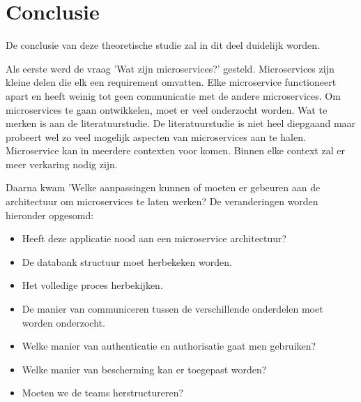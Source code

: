 
\chapter{Conclusie}
\label{ch:conclusie}


De conclusie van deze theoretische studie zal in dit deel duidelijk worden.

Als eerste werd de vraag 'Wat zijn microservices?' gesteld. 
Microservices zijn kleine delen die elk een requirement omvatten. Elke microservice functioneert apart en heeft weinig tot geen communicatie met de andere microservices. Om microservices te gaan ontwikkelen, moet er veel onderzocht worden. Wat te merken is aan de literatuurstudie. De literatuurstudie is niet heel diepgaand maar probeert wel zo veel mogelijk aspecten van microservices aan te halen. Microservice kan in meerdere contexten voor komen. Binnen elke context zal er meer verkaring nodig zijn. 

Daarna kwam 'Welke aanpassingen kunnen of moeten er gebeuren aan de architectuur om microservices te laten werken? De veranderingen worden hieronder opgesomd:
\begin{itemize}
	\item Heeft deze applicatie nood aan een microservice architectuur?
	\item De databank structuur moet herbekeken worden.
	\item Het volledige proces herbekijken.
	\item De manier van communiceren tussen de verschillende onderdelen moet worden onderzocht.
	\item Welke manier van authenticatie en authorisatie gaat men gebruiken?
	\item Welke manier van bescherming kan er toegepast worden?
	\item Moeten we de teams herstructureren?
\end{itemize}

